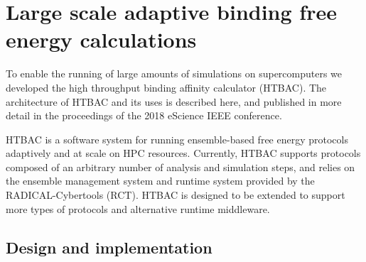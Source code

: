 \section{Large scale adaptive binding free energy calculations}

To enable the running of large amounts of simulations on supercomputers we developed the high throughput binding affinity calculator (HTBAC). The architecture of HTBAC and its uses is described here, and published in more detail in the proceedings of the 2018 eScience IEEE conference.
 
HTBAC is a software system for running ensemble-based free energy protocols adaptively and at scale on HPC resources. Currently, HTBAC supports protocols composed of an arbitrary number of analysis and simulation steps, and relies on the ensemble management system and runtime system provided by the RADICAL-Cybertools (RCT). HTBAC is designed to be extended to support more types of protocols and alternative runtime middleware.

\subsection{Design and implementation}


